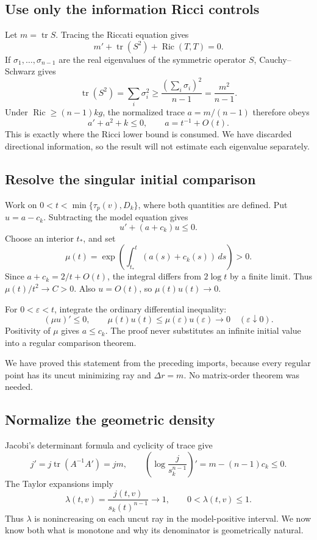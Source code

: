 \documentclass[12pt,reqno]{amsart}
\begin{document}
\subsection{Use only the information Ricci controls}
Let \(m=\operatorname{tr}S\). Tracing the Riccati equation gives
\[
m'+\operatorname{tr}(S^2)+\operatorname{Ric}(T,T)=0.
\]
If \(\sigma_1,\ldots,\sigma_{n-1}\) are the real eigenvalues of the symmetric operator \(S\), Cauchy--Schwarz gives
\[
\operatorname{tr}(S^2)=\sum_i\sigma_i^2
\ge\frac{(\sum_i\sigma_i)^2}{n-1}=\frac{m^2}{n-1}.
\]
Under \(\operatorname{Ric}\ge(n-1)kg\), the normalized trace \(a=m/(n-1)\) therefore obeys
\[
a'+a^2+k\le0,\qquad a=t^{-1}+O(t).
\]
This is exactly where the Ricci lower bound is consumed. We have discarded directional information, so the result will not estimate each eigenvalue separately.

\subsection{Resolve the singular initial comparison}
Work on \(0<t<\min\{\tau_p(v),D_k\}\), where both quantities are defined. Put \(u=a-c_k\). Subtracting the model equation gives
\[
u'+(a+c_k)u\le0.
\]
Choose an interior \(t_*\), and set
\[
\mu(t)=\exp\left(\int_{t_*}^t(a(s)+c_k(s))\,ds\right)>0.
\]
Since \(a+c_k=2/t+O(t)\), the integral differs from \(2\log t\) by a finite limit. Thus \(\mu(t)/t^2\to C>0\). Also \(u=O(t)\), so \(\mu(t)u(t)\to0\).

For \(0<\varepsilon<t\), integrate the ordinary differential inequality:
\[
(\mu u)'\le0,
\qquad \mu(t)u(t)\le\mu(\varepsilon)u(\varepsilon)
\longrightarrow0\quad(\varepsilon\downarrow0).
\]
Positivity of \(\mu\) gives \(a\le c_k\). The proof never substitutes an infinite initial value into a regular comparison theorem.

\begin{samepage}
\begin{theorem}
\label{thm:laplacian}

\end{theorem}
\end{samepage}

We have proved this statement from the preceding imports, because every regular point has its uncut minimizing ray and \(\Delta r=m\). No matrix-order theorem was needed.

\subsection{Normalize the geometric density}
Jacobi's determinant formula and cyclicity of trace give
\[
j'=j\operatorname{tr}(A^{-1}A')=jm,
\qquad \left(\log\frac{j}{s_k^{n-1}}\right)'=m-(n-1)c_k\le0.
\]
The Taylor expansions imply
\[
\lambda(t,v)=\frac{j(t,v)}{s_k(t)^{n-1}}\longrightarrow1,
\qquad 0<\lambda(t,v)\le1.
\]
Thus \(\lambda\) is nonincreasing on each uncut ray in the model-positive interval. We now know both what is monotone and why its denominator is geometrically natural.
\end{document}
